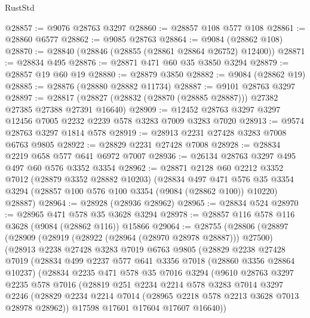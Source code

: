 \begin{lexlean}{RustStd}
\begin{coremodule}
@28857 := @9076 @28763 @3297
@28860 := @28857 @108 @577 @108
@28861 := @28860 @6577
@28862 := @9085 @28763
@28864 := @9084 (@28862 @108)
@28870 := @28840 (@28846 (@28855 (@28861 @28864 @26752) @12400))
@28871 := @28834 @495
@28876 := @28871 @471 @60 @35 @3850 @3294
@28879 := @28857 @19 @60 @19
@28880 := @28879 @3850
@28882 := @9084 (@28862 @19)
@28885 := @28876 (@28880 @28882 @11734)
@28887 := @9101 @28763 @3297
@28897 := @28817 (@28827 (@28832 (@28870 (@28885 @28887))) @27382 @27385 @27388 @27391 @16640)
@28909 := @12452 @28763 @3297 @3297 @12456 @7005 @2232 @2239 @578 @3283 @7009 @3283 @7020
@28913 := @9574 @28763 @3297 @1814 @578
@28919 := @28913 @2231 @27428 @3283 @7008 @6763 @9805
@28922 := @28829 @2231 @27428 @7008
@28928 := @28834 @2219 @658 @577 @641 @6972 @7007
@28936 := @26134 @28763 @3297 @495 @497 @60 @576 @3352 @3354
@28962 := @28871
    @2128
    @60
    @2212
    @3352
    @7012
    (@28879 @3352 @28882 @10203)
    (@28834
      @497
      @471
      @576
      @35
      @3354
      @3294
      (@28857 @100 @576 @100 @3354 (@9084 (@28862 @100)) @10220)
      @28887)
@28964 := @28928 (@28936 @28962)
@28965 := @28834 @524
@28970 := @28965 @471 @578 @35 @3628 @3294
@28978 := @28857 @116 @578 @116 @3628 (@9084 (@28862 @116)) @15866
@29064 := @28755
    (@28806
      (@28897
        (@28909
          (@28919 (@28922 (@28964 (@28970 @28978 @28887))) @27500)
          (@28913
            @2238
            @27428
            @3283
            @7019
            @6763
            @9805
            (@28829
              @2238
              @27428
              @7019
              (@28834
                @499
                @2237
                @577
                @641
                @3356
                @7018
                (@28860 @3356 @28864 @10237)
                (@28834
                  @2235
                  @471
                  @578
                  @35
                  @7016
                  @3294
                  (@9610
                    @28763
                    @3297
                    @2235
                    @578
                    @7016
                    (@28819
                      @251
                      @2234
                      @2214
                      @578
                      @3283
                      @7014
                      @3297
                      @2246
                      (@28829 @2234 @2214 @7014 (@28965 @2218 @578 @2213 @3628 @7013 @28978 @28962))
                      @17598
                      @17601
                      @17604
                      @17607
                      @16640))

\end{coremodule}
\end{lexlean}
